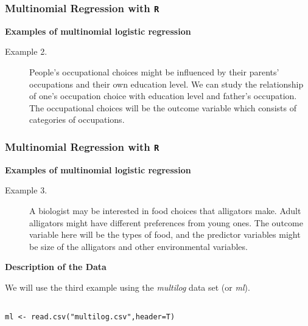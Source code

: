 \documentclass[00-GLMregslides.tex]{subfiles}
\begin{document}
\begin{frame}[fragile]
	
	\frametitle{Multinomial Regression with \texttt{R}}
	\Large
	\textbf{Examples of multinomial logistic regression}
	
	\begin{description}
		\item[Example 2.] People's occupational choices might be influenced by their parents' occupations and their own education level. We can study the relationship of one's occupation choice with education level and father's occupation. The occupational choices will be the outcome variable which consists of categories of occupations. 
		

	\end{description}
\end{frame}
\begin{frame}[fragile]

\frametitle{Multinomial Regression with \texttt{R}}
\Large
\textbf{Examples of multinomial logistic regression}

\begin{description}

\item[Example 3.] A biologist may be interested in food choices that alligators make. Adult alligators might have different preferences from young ones. The outcome variable here will be the types of food, and the predictor variables might be size of the alligators and other environmental variables.
 

\end{description}
\end{frame}
\begin{frame}[fragile]
\Large
\textbf{Description of the Data}
 
We will use the third example using the \textit{multilog} data set (or \textit{ml}).


\begin{framed}
\begin{verbatim}

ml <- read.csv("multilog.csv",header=T)
\end{verbatim}
\end{framed}
 
 
\end{frame}
\end{document}
